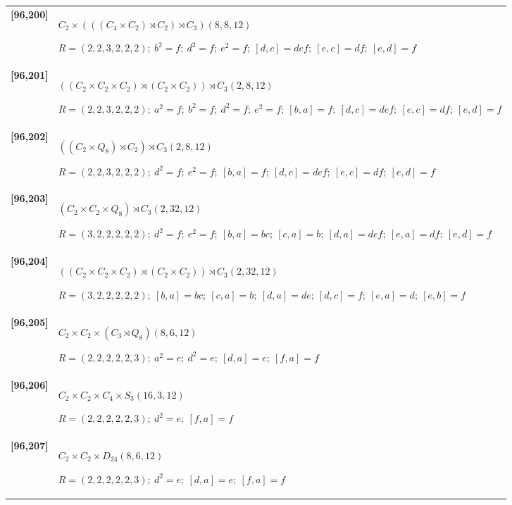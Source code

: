 \documentclass[UTF8,fontset=fandol,11pt,a4paper]{ctexart}
\begin{document}
\begin{longtable}{@{}p{17mm}>{\raggedright\arraybackslash}p{141mm}@{}}
\textbf{[96,200]} & $C_{2}\times (((C_{4}\times C_{2})\rtimes C_{2})\rtimes C_{3})$\quad $(8,8,12)$\par\(R=(2,2,3,2,2,2);\allowbreak\ b^{2}=f;\allowbreak\ d^{2}=f;\allowbreak\ e^{2}=f;\allowbreak\ [d,c]=def;\allowbreak\ [e,c]=df;\allowbreak\ [e,d]=f\)\\[3pt]

\textbf{[96,201]} & $((C_{2}\times C_{2}\times C_{2})\rtimes (C_{2}\times C_{2}))\rtimes C_{3}$\quad $(2,8,12)$\par\(R=(2,2,3,2,2,2);\allowbreak\ a^{2}=f;\allowbreak\ b^{2}=f;\allowbreak\ d^{2}=f;\allowbreak\ e^{2}=f;\allowbreak\ [b,a]=f;\allowbreak\ [d,c]=def;\allowbreak\ [e,c]=df;\allowbreak\ [e,d]=f\)\\[3pt]

\textbf{[96,202]} & $((C_{2}\times Q_{8})\rtimes C_{2})\rtimes C_{3}$\quad $(2,8,12)$\par\(R=(2,2,3,2,2,2);\allowbreak\ d^{2}=f;\allowbreak\ e^{2}=f;\allowbreak\ [b,a]=f;\allowbreak\ [d,c]=def;\allowbreak\ [e,c]=df;\allowbreak\ [e,d]=f\)\\[3pt]

\textbf{[96,203]} & $(C_{2}\times C_{2}\times Q_{8})\rtimes C_{3}$\quad $(2,32,12)$\par\(R=(3,2,2,2,2,2);\allowbreak\ d^{2}=f;\allowbreak\ e^{2}=f;\allowbreak\ [b,a]=bc;\allowbreak\ [c,a]=b;\allowbreak\ [d,a]=def;\allowbreak\ [e,a]=df;\allowbreak\ [e,d]=f\)\\[3pt]

\textbf{[96,204]} & $((C_{2}\times C_{2}\times C_{2})\rtimes (C_{2}\times C_{2}))\rtimes C_{3}$\quad $(2,32,12)$\par\(R=(3,2,2,2,2,2);\allowbreak\ [b,a]=bc;\allowbreak\ [c,a]=b;\allowbreak\ [d,a]=de;\allowbreak\ [d,c]=f;\allowbreak\ [e,a]=d;\allowbreak\ [e,b]=f\)\\[3pt]

\textbf{[96,205]} & $C_{2}\times C_{2}\times (C_{3}\rtimes Q_{8})$\quad $(8,6,12)$\par\(R=(2,2,2,2,2,3);\allowbreak\ a^{2}=e;\allowbreak\ d^{2}=e;\allowbreak\ [d,a]=e;\allowbreak\ [f,a]=f\)\\[3pt]

\textbf{[96,206]} & $C_{2}\times C_{2}\times C_{4}\times S_{3}$\quad $(16,3,12)$\par\(R=(2,2,2,2,2,3);\allowbreak\ d^{2}=e;\allowbreak\ [f,a]=f\)\\[3pt]

\textbf{[96,207]} & $C_{2}\times C_{2}\times D_{24}$\quad $(8,6,12)$\par\(R=(2,2,2,2,2,3);\allowbreak\ d^{2}=e;\allowbreak\ [d,a]=e;\allowbreak\ [f,a]=f\)\\[3pt]


\end{longtable}
\end{document}
